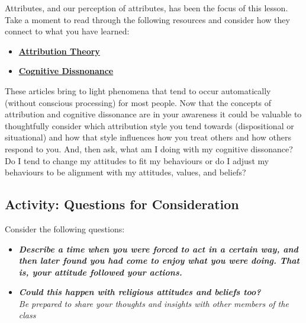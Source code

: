 \documentclass[
]{book}
\providecommand{\tightlist}{%
  \setlength{\itemsep}{0pt}\setlength{\parskip}{0pt}}
\begin{document}
\begin{reflect}
Attributes, and our perception of attributes, has been the focus of this lesson. Take a moment to read through the following resources and consider how they connect to what you have learned:

\begin{itemize}
\tightlist
\item
  \href{https://www.verywellmind.com/attribution-social-psychology-2795898}{\textbf{Attribution Theory}}\\
\item
  \href{https://www.simplypsychology.org/cognitive-dissonance.html}{\textbf{Cognitive Dissnonance}}
\end{itemize}

These articles bring to light phenomena that tend to occur automatically (without conscious processing) for most people. Now that the concepts of attribution and cognitive dissonance are in your awareness it could be valuable to thoughtfully consider which attribution style you tend towards (dispositional or situational) and how that style influences how you treat others and how others respond to you. And, then ask, what am I doing with my cognitive dissonance? Do I tend to change my attitudes to fit my behaviours or do I adjust my behaviours to be alignment with my attitudes, values, and beliefs?
\end{reflect}

\hypertarget{activity-questions-for-consideration-9}{%
\subsection*{Activity: Questions for Consideration}\label{activity-questions-for-consideration-9}}

\begin{reflect}
Consider the following questions:

\begin{itemize}
\tightlist
\item
  \textbf{\emph{Describe a time when you were forced to act in a certain way, and then later found you had come to enjoy what you were doing. That is, your attitude followed your actions.}}\\
\item
  \textbf{\emph{Could this happen with religious attitudes and beliefs too?}}\\
  \emph{Be prepared to share your thoughts and insights with other members of the class}
\end{itemize}
\end{reflect}
\end{document}
